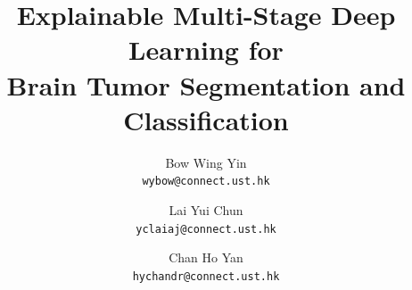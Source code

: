 \documentclass[10pt,twocolumn,letterpaper]{article}
\title{Explainable Multi-Stage Deep Learning for \\ 
Brain Tumor Segmentation and Classification}
\author{Bow Wing Yin\\
{\tt wybow@connect.ust.hk}
\and
Lai Yui Chun \\
{\tt yclaiaj@connect.ust.hk}
\and
Chan Ho Yan \\
{\tt hychandr@connect.ust.hk}
}
\begin{document}
\maketitle
   







{
    \small
    
    
}
\clearpage
\onecolumn

% 
\end{document}
